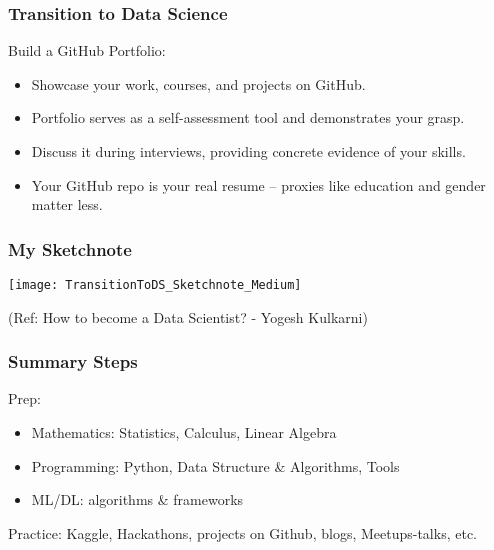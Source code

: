 \begin{frame}[fragile]\frametitle{Transition to Data Science}

Build a GitHub Portfolio:
        \begin{itemize}
            \item Showcase your work, courses, and projects on GitHub.
            \item Portfolio serves as a self-assessment tool and demonstrates your grasp.
            \item Discuss it during interviews, providing concrete evidence of your skills.
            \item Your GitHub repo is your real resume – proxies like education and gender matter less.
        \end{itemize}
			
\end{frame}

\begin{frame}[fragile]\frametitle{My Sketchnote}
	
	\begin{center}
	\texttt{[image: TransitionToDS\_Sketchnote\_Medium]}
	\end{center}
{\tiny (Ref: How to become a Data Scientist? - Yogesh Kulkarni)}
\end{frame}

\begin{frame}[fragile]\frametitle{Summary Steps}

Prep:
      \begin{itemize}
			\item Mathematics: Statistics, Calculus, Linear Algebra
			\item Programming: Python, Data Structure \& Algorithms, Tools
			\item ML/DL: algorithms \& frameworks
			\end{itemize}
			
Practice: Kaggle, Hackathons, projects on Github, blogs, Meetups-talks, etc.
			
\end{frame}

